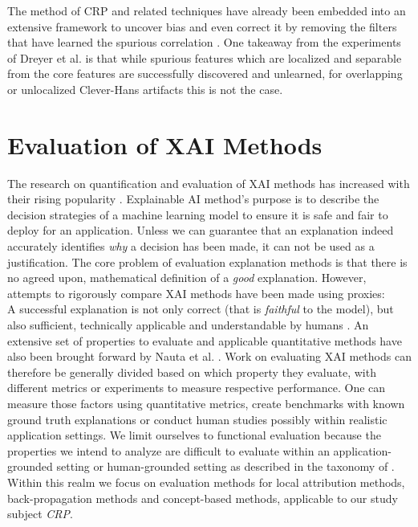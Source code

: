 The method of CRP and related techniques have already been embedded into an extensive framework to uncover bias and even correct it by removing the filters that have learned the spurious correlation \cite{Pahde2023,Dreyer2023,Dreyer2023a}. One takeaway from the experiments of Dreyer et al. \cite{Dreyer2023a} is that while spurious features which are localized and separable from the core features are successfully discovered and unlearned, for overlapping or unlocalized Clever-Hans artifacts this is not the case. 

\section{Evaluation of XAI Methods}
The research on quantification and evaluation of XAI methods has increased with their rising popularity \cite{Nauta2023}. 
Explainable AI method's purpose is to describe the decision strategies of a machine learning model to ensure it is safe and fair to deploy for an application. 
Unless we can guarantee that an explanation indeed accurately identifies \textit{why} a decision has been made, it can not be used as a justification.
The core problem of evaluation explanation methods is that there is no agreed upon, mathematical definition of a \textit{good} explanation. However, attempts to rigorously compare XAI methods have been made using proxies:\\
A successful explanation is not only correct (that is \textit{faithful} to the model), but also sufficient, technically applicable and understandable by humans \cite{Samek2021}. An extensive set of properties to evaluate and applicable quantitative methods have also been brought forward by Nauta et al. \cite{Nauta2023}. Work on evaluating XAI methods can therefore be generally divided based on which property they evaluate, with different metrics or experiments to measure respective performance. One can measure those factors using quantitative metrics, create benchmarks with known ground truth explanations or conduct human studies possibly within realistic application settings. We limit ourselves to functional evaluation because the properties we intend to analyze are difficult to evaluate within an application-grounded setting or human-grounded setting as described in the taxonomy of \cite{Nauta2023}. Within this realm we focus on evaluation methods for local attribution methods, back-propagation methods and concept-based methods, applicable to our study subject \textit{CRP}. 

